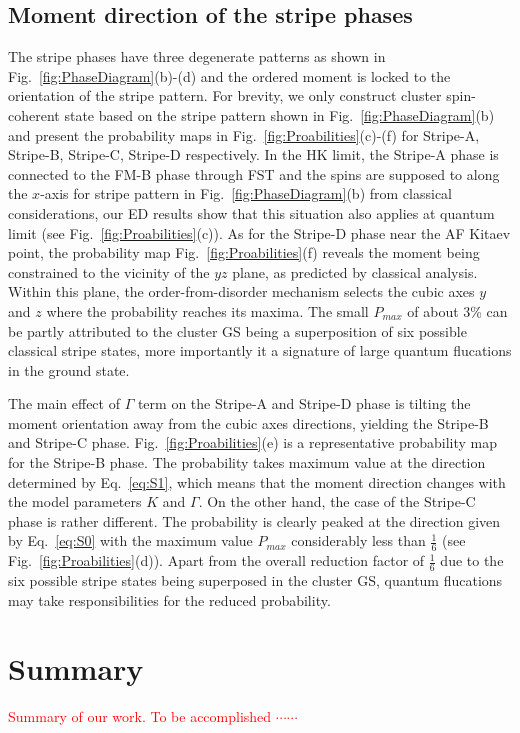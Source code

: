\documentclass[aps,prb,reprint,amsfonts,amsmath,amssymb,showpacs,groupedaddress,superscriptaddress]{revtex4-1}
\begin{document}
\subsection{\label{sec:SectionVB}Moment direction of the stripe phases}
The stripe phases have three degenerate patterns as shown in Fig.~\ref{fig:PhaseDiagram}(b)-(d) and the ordered moment is locked to the orientation of the stripe pattern. For brevity, we only construct cluster spin-coherent state based on the stripe pattern shown in Fig.~\ref{fig:PhaseDiagram}(b) and present the probability maps in Fig.~\ref{fig:Proabilities}(c)-(f) for Stripe-A, Stripe-B, Stripe-C, Stripe-D respectively. In the HK limit, the Stripe-A phase is connected to the FM-B phase through FST and the spins are supposed to along the $x$-axis for stripe pattern in Fig.~\ref{fig:PhaseDiagram}(b) from classical considerations, our ED results show that this situation also applies at quantum limit (see Fig.~\ref{fig:Proabilities}(c)). As for the Stripe-D phase near the AF Kitaev point, the probability map Fig.~\ref{fig:Proabilities}(f) reveals the moment being constrained to the vicinity of the $yz$ plane, as predicted by classical analysis. Within this plane, the order-from-disorder mechanism selects the cubic axes $y$ and $z$ where the probability reaches its maxima. The small $P_{max}$ of about 3\% can be partly attributed to the cluster GS being a superposition of six possible classical stripe states, more importantly it a signature of large quantum flucations in the ground state.

The main effect of $\Gamma$ term on the Stripe-A and Stripe-D phase is tilting the moment orientation away from the cubic axes directions, yielding the Stripe-B and Stripe-C phase. Fig.~\ref{fig:Proabilities}(e) is a representative probability map for the Stripe-B phase. The probability takes maximum value at the direction determined by Eq.~\eqref{eq:S1}, which means that the moment direction changes with the model parameters $K$ and $\Gamma$. On the other hand, the case of the Stripe-C phase is rather different. The probability is clearly peaked at the direction given by Eq.~\eqref{eq:S0} with the maximum value $P_{max}$ considerably less than $\frac{1}{6}$ (see Fig.~\ref{fig:Proabilities}(d)). Apart from the overall reduction factor of $\frac{1}{6}$ due to the six possible stripe states being superposed in the cluster GS, quantum flucations may take responsibilities for the reduced probability.

\section{\label{sec:SectionVI}Summary}
\textcolor{red}{Summary of our work. To be accomplished $\cdots \cdots$}
\end{document}
